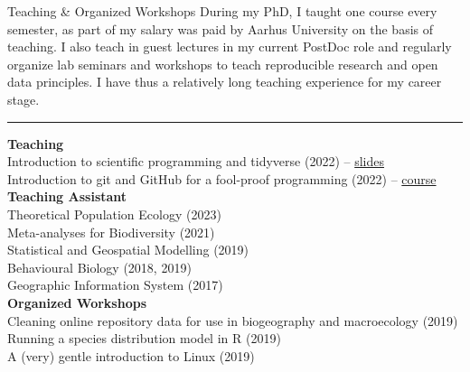 \documentclass{resume} %
\newcommand{\spazio}{\begin{center} \par\noindent\rule{0.2\textwidth}{0.4pt} \end{center}}
\begin{document}
\begin{rSection}{Teaching \& Organized Workshops}
During my PhD, I taught one course every semester, as part of my salary was paid by Aarhus University on the basis of teaching.
I also teach in guest lectures in my current PostDoc role and regularly organize lab seminars and workshops to teach reproducible research and open data principles.
I have thus a relatively long teaching experience for my career stage.

\spazio

{\bf Teaching} \\
Introduction to scientific programming and tidyverse (2022) -- \href{https://emilio-berti.github.io/teaching/tidyverse.html#(1)}{slides}\\
Introduction to git and GitHub for a fool-proof programming (2022) -- \href{https://emilio-berti.github.io/idiv-git-introduction/}{course}\\
{\bf Teaching Assistant} \\
Theoretical Population Ecology (2023)\\
Meta-analyses for Biodiversity (2021)\\
Statistical and Geospatial Modelling (2019)\\
Behavioural Biology (2018, 2019)\\
Geographic Information System (2017)\\
{\bf Organized Workshops}\\
Cleaning online repository data for use in biogeography and macroecology (2019)\\
Running a species distribution model in R (2019)\\
A (very) gentle introduction to Linux (2019)
\end{rSection}
\end{document}
